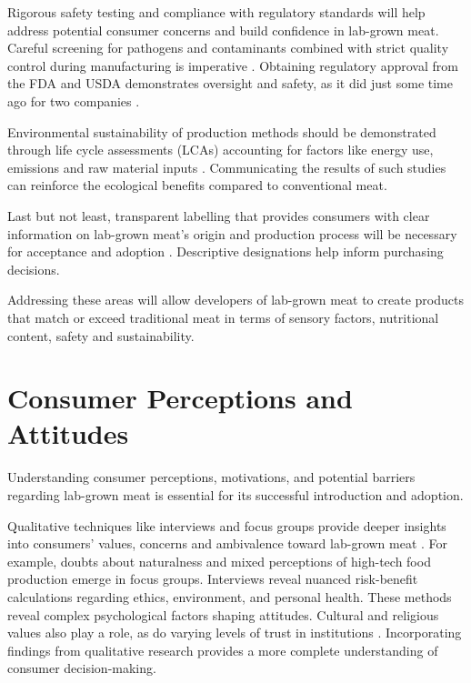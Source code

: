 \documentclass[10pt]{article}
\begin{document}
\begin{sloppypar}
  Rigorous safety testing and compliance with regulatory standards will help address potential consumer concerns and build confidence in lab-grown meat. Careful screening for pathogens and contaminants combined with strict quality control during manufacturing is imperative \citep{ong_food_2021}. Obtaining regulatory approval from the FDA and USDA demonstrates oversight and safety, as it did just some time ago for two companies \citep{mccarthy_usda_nodate}.

  Environmental sustainability of production methods should be demonstrated through life cycle assessments (LCAs) accounting for factors like energy use, emissions and raw material inputs \citep{mattick_anticipatory_2015}. Communicating the results of such studies can reinforce the ecological benefits compared to conventional meat.

  Last but not least, transparent labelling that provides consumers with clear information on lab-grown meat’s origin and production process will be necessary for acceptance and adoption \citep{failla_evaluation_2023}. Descriptive designations help inform purchasing decisions.

  Addressing these areas will allow developers of lab-grown meat to create products that match or exceed traditional meat in terms of sensory factors, nutritional content, safety and sustainability.

  \section{Consumer Perceptions and Attitudes}
  \label{sec:consumer-perceptions-and-attitudes}

  Understanding consumer perceptions, motivations, and potential barriers regarding lab-grown meat is essential for its successful introduction and adoption.

  Qualitative techniques like interviews and focus groups provide deeper insights into consumers’ values, concerns and ambivalence toward lab-grown meat \citep{laestadius_is_2015}. For example, doubts about naturalness and mixed perceptions of high-tech food production emerge in focus groups. Interviews reveal nuanced risk-benefit calculations regarding ethics, environment, and personal health. These methods reveal complex psychological factors shaping attitudes. Cultural and religious values also play a role, as do varying levels of trust in institutions \citep{al-kwifi_dynamics_2019}. Incorporating findings from qualitative research provides a more complete understanding of consumer decision-making.


\end{sloppypar}
\end{document}
